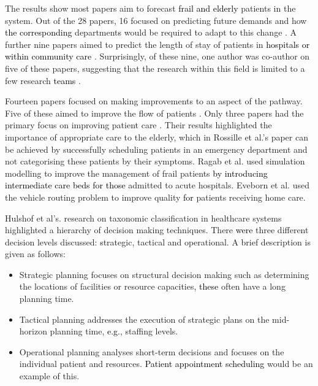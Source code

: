 \documentclass[../thesis.tex]{subfiles}
\begin{document}
The results show most papers aim to forecast \textcolor{black}{frail and elderly} patients in the system. Out of the 28 papers, 16 focused on predicting future demands and how \textcolor{black}{the corresponding} department\textcolor{black}{s} would be required to adapt to this change \cite{Ambagtsheer, Bae, Borowiak, Christodoulou,  Davari, Desai, Gorunescu, Grenouilleau, Hare, Johnson, Katsaliaki, YLi, Bidhandi, Patrick,Zhang1, Zhang2}. A further nine papers aimed to predict the length of stay of patients in \textcolor{black}{hospitals or within community care} \cite{Abe, Gordon2, Heggestad, Marshall1, Marshall2, Marshall3, Shaw, Taylor, Xie}. Surprisingly, of these nine, one author was co-author on five of these papers, suggesting that the research within this field is limited to a few research \textcolor{black}{teams} \cite{Gordon2, Marshall1, Marshall2, Marshall3, Shaw}.

Fourteen papers focused on making improvements to an aspect of the pathway. Five of these aimed to improve the flow of patients \cite{Chaussalet, Hamdani, Rashwan, Silvester, Trevisan}. Only three papers had the primary focus on improving patient care \cite{Eveborn, Ragab, Rossille}. Their results highlighted the importance of appropriate care to the elderly, which in Rossille et al.'s \cite{Rossille} paper can be achieved by successfully scheduling patients in an emergency department and not categorising these patients by their symptoms. Ragab et al. \cite{Ragab} used simulation modelling to improve the management of frail patients \textcolor{black}{by introducing intermediate care beds for those} admitted to acute hospitals. Eveborn et al. \cite{Eveborn} used the vehicle routing problem to improve quality \textcolor{black}{for} patients receiving home care.

Hulshof et al's. \cite{PHulshof} research on taxonomic classification in healthcare systems highlighted a hierarchy of decision making techniques. There \textcolor{black}{were} three different decision levels discussed: \textcolor{black}{s}trategic, tactical and operational. A brief description is given as follows:

\begin{itemize}
    \item Strategic planning focuses on structural decision making such as determining the locations of facilities or resource capacities\textcolor{black}{, these} often have a long planning time.
    \item Tactical planning addresses the execution of strategic plans on the mid-horizon planning time, \textcolor{black}{e.g.}, staffing levels.
    \item Operational planning analyses short-term decisions and focuses on the individual patient and resources. \textcolor{black}{Patient appointment scheduling} would be an example of this.
\end{itemize}
\end{document}
